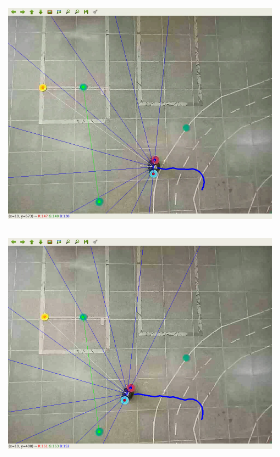\begin{figure}[H]
\begin{center}
\begin{subfigure}[b]{0.60\textwidth}
\begin{subfigure}[b]{0.24\textwidth}
            \includegraphics[width=\textwidth]{imagens/real_envs/real_env1_sac/3.png}
        \end{subfigure}
        \hfill
        \begin{subfigure}[b]{0.24\textwidth}
            \includegraphics[width=\textwidth]{imagens/real_envs/real_env1_ddpg/4.png}
        \end{subfigure}
        

\end{subfigure}
\end{center}
\end{figure}
